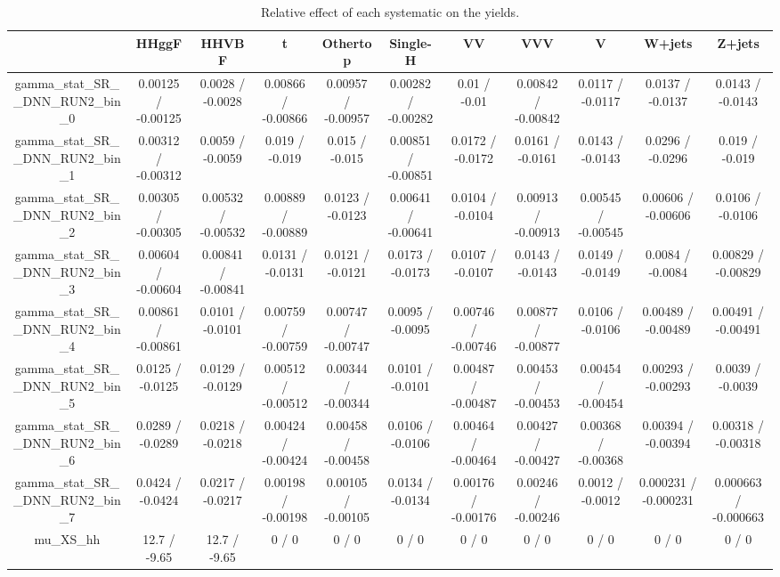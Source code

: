 \documentclass[10pt]{article}
\begin{document}
\begin{table}[htbp]
\begin{center}
\begin{tabular}{|c|c|c|c|c|c|c|c|c|c|c|}
\hline 
      & HHggF      & HHVBF      & t      & Othertop      & Single-H      & VV      & VVV      & V      & W+jets      & Z+jets \\ 
\hline 
  gamma_stat_SR__DNN_RUN2_bin_0 & 0.00125 / -0.00125 & 0.0028 / -0.0028 & 0.00866 / -0.00866 & 0.00957 / -0.00957 & 0.00282 / -0.00282 & 0.01 / -0.01 & 0.00842 / -0.00842 & 0.0117 / -0.0117 & 0.0137 / -0.0137 & 0.0143 / -0.0143 \\ 
  gamma_stat_SR__DNN_RUN2_bin_1 & 0.00312 / -0.00312 & 0.0059 / -0.0059 & 0.019 / -0.019 & 0.015 / -0.015 & 0.00851 / -0.00851 & 0.0172 / -0.0172 & 0.0161 / -0.0161 & 0.0143 / -0.0143 & 0.0296 / -0.0296 & 0.019 / -0.019 \\ 
  gamma_stat_SR__DNN_RUN2_bin_2 & 0.00305 / -0.00305 & 0.00532 / -0.00532 & 0.00889 / -0.00889 & 0.0123 / -0.0123 & 0.00641 / -0.00641 & 0.0104 / -0.0104 & 0.00913 / -0.00913 & 0.00545 / -0.00545 & 0.00606 / -0.00606 & 0.0106 / -0.0106 \\ 
  gamma_stat_SR__DNN_RUN2_bin_3 & 0.00604 / -0.00604 & 0.00841 / -0.00841 & 0.0131 / -0.0131 & 0.0121 / -0.0121 & 0.0173 / -0.0173 & 0.0107 / -0.0107 & 0.0143 / -0.0143 & 0.0149 / -0.0149 & 0.0084 / -0.0084 & 0.00829 / -0.00829 \\ 
  gamma_stat_SR__DNN_RUN2_bin_4 & 0.00861 / -0.00861 & 0.0101 / -0.0101 & 0.00759 / -0.00759 & 0.00747 / -0.00747 & 0.0095 / -0.0095 & 0.00746 / -0.00746 & 0.00877 / -0.00877 & 0.0106 / -0.0106 & 0.00489 / -0.00489 & 0.00491 / -0.00491 \\ 
  gamma_stat_SR__DNN_RUN2_bin_5 & 0.0125 / -0.0125 & 0.0129 / -0.0129 & 0.00512 / -0.00512 & 0.00344 / -0.00344 & 0.0101 / -0.0101 & 0.00487 / -0.00487 & 0.00453 / -0.00453 & 0.00454 / -0.00454 & 0.00293 / -0.00293 & 0.0039 / -0.0039 \\ 
  gamma_stat_SR__DNN_RUN2_bin_6 & 0.0289 / -0.0289 & 0.0218 / -0.0218 & 0.00424 / -0.00424 & 0.00458 / -0.00458 & 0.0106 / -0.0106 & 0.00464 / -0.00464 & 0.00427 / -0.00427 & 0.00368 / -0.00368 & 0.00394 / -0.00394 & 0.00318 / -0.00318 \\ 
  gamma_stat_SR__DNN_RUN2_bin_7 & 0.0424 / -0.0424 & 0.0217 / -0.0217 & 0.00198 / -0.00198 & 0.00105 / -0.00105 & 0.0134 / -0.0134 & 0.00176 / -0.00176 & 0.00246 / -0.00246 & 0.0012 / -0.0012 & 0.000231 / -0.000231 & 0.000663 / -0.000663 \\ 
  mu_XS_hh & 12.7 / -9.65 & 12.7 / -9.65 & 0 / 0 & 0 / 0 & 0 / 0 & 0 / 0 & 0 / 0 & 0 / 0 & 0 / 0 & 0 / 0 \\ 
\hline 
\end{tabular} 
\caption{Relative effect of each systematic on the yields.} 
\end{center} 
\end{table} 
\end{document}
